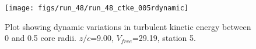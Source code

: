 \begin{figure}[H]
\centering
\texttt{[image: figs/run\_48/run\_48\_ctke\_005rdynamic]}
\caption{Plot showing dynamic variations in turbulent kinetic energy between 0 and 0.5 core radii. $z/c$=9.00, $V_{free}$=29.19, station 5.}
\end{figure}


